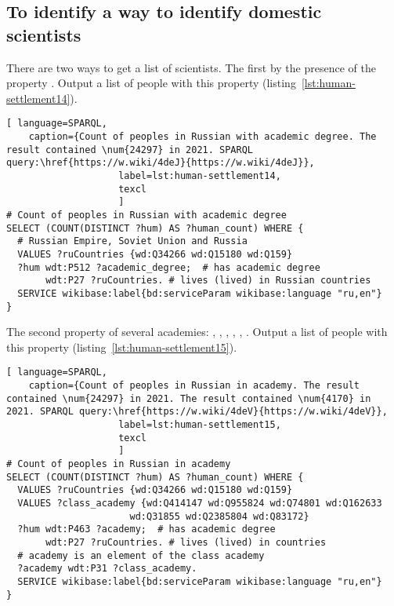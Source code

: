 \subsection{To identify a way to identify domestic scientists}

There are two ways to get a list of scientists. 
The first by the presence of the property . 
Output a list of people with this property (listing~\protect\ref{lst:human-settlement14}).

\begin{lstlisting}[ language=SPARQL,
    caption={Count of peoples in Russian with academic degree. The result contained \num{24297} in 2021. SPARQL query:\href{https://w.wiki/4deJ}{https://w.wiki/4deJ}},  
                    label=lst:human-settlement14,
                    texcl 
                    ]
# Count of peoples in Russian with academic degree
SELECT (COUNT(DISTINCT ?hum) AS ?human_count) WHERE {
  # Russian Empire, Soviet Union and Russia
  VALUES ?ruCountries {wd:Q34266 wd:Q15180 wd:Q159}
  ?hum wdt:P512 ?academic_degree;  # has academic degree 
       wdt:P27 ?ruCountries. # lives (lived) in Russian countries
  SERVICE wikibase:label{bd:serviceParam wikibase:language "ru,en"}
}
\end{lstlisting}%

The second property  of several academies: , , , , , . Output a list of people with this property (listing~\protect\ref{lst:human-settlement15}).

\begin{lstlisting}[ language=SPARQL, 
    caption={Count of peoples in Russian in academy. The result contained \num{24297} in 2021. The result contained \num{4170} in 2021. SPARQL query:\href{https://w.wiki/4deV}{https://w.wiki/4deV}},
                    label=lst:human-settlement15,
                    texcl 
                    ]
# Count of peoples in Russian in academy
SELECT (COUNT(DISTINCT ?hum) AS ?human_count) WHERE {
  VALUES ?ruCountries {wd:Q34266 wd:Q15180 wd:Q159}
  VALUES ?class_academy {wd:Q414147 wd:Q955824 wd:Q74801 wd:Q162633 
                      wd:Q31855 wd:Q2385804 wd:Q83172}
  ?hum wdt:P463 ?academy;  # has academic degree 
       wdt:P27 ?ruCountries. # lives (lived) in countries
  # academy is an element of the class academy
  ?academy wdt:P31 ?class_academy. 
  SERVICE wikibase:label{bd:serviceParam wikibase:language "ru,en"}
}
\end{lstlisting}%


